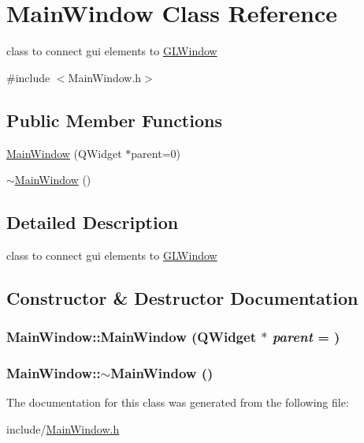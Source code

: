 \hypertarget{classMainWindow}{
\section{MainWindow Class Reference}
\label{classMainWindow}
}


class to connect gui elements to \hyperlink{classGLWindow}{GLWindow}  


{\ttfamily \#include $<$MainWindow.h$>$}\subsection*{Public Member Functions}
\begin{DoxyCompactItemize}
\item 
\hyperlink{classMainWindow_a8b244be8b7b7db1b08de2a2acb9409db}{MainWindow} (QWidget $\ast$parent=0)
\item 
\hyperlink{classMainWindow_ae98d00a93bc118200eeef9f9bba1dba7}{$\sim$MainWindow} ()
\end{DoxyCompactItemize}


\subsection{Detailed Description}
class to connect gui elements to \hyperlink{classGLWindow}{GLWindow} 

\subsection{Constructor \& Destructor Documentation}
\hypertarget{classMainWindow_a8b244be8b7b7db1b08de2a2acb9409db}{
\subsubsection[{MainWindow}]{\setlength{\rightskip}{0pt plus 5cm}MainWindow::MainWindow (QWidget $\ast$ {\em parent} = {})}}
\label{classMainWindow_a8b244be8b7b7db1b08de2a2acb9409db}
\hypertarget{classMainWindow_ae98d00a93bc118200eeef9f9bba1dba7}{
\subsubsection[{$\sim$MainWindow}]{\setlength{\rightskip}{0pt plus 5cm}MainWindow::$\sim$MainWindow ()}}
\label{classMainWindow_ae98d00a93bc118200eeef9f9bba1dba7}


The documentation for this class was generated from the following file:\begin{DoxyCompactItemize}
\item 
include/\hyperlink{MainWindow_8h}{MainWindow.h}\end{DoxyCompactItemize}
